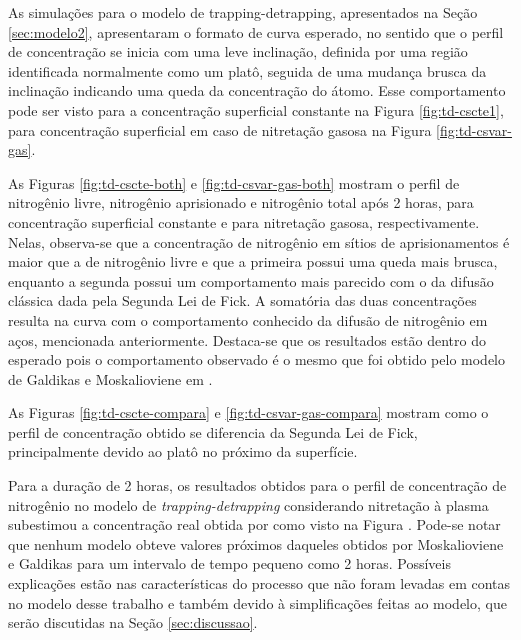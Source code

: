 
As simulações para o modelo de trapping-detrapping, apresentados na Seção \ref{sec:modelo2}, apresentaram o formato de curva esperado, no sentido que o perfil de concentração se inicia com uma leve inclinação, definida por uma região identificada normalmente como um platô, seguida de uma mudança brusca da inclinação indicando uma queda da concentração do átomo. Esse comportamento pode ser visto para a concentração superficial constante na Figura \ref{fig:td-cscte1}, para concentração superficial em caso de nitretação gasosa na Figura \ref{fig:td-csvar-gas}.

As Figuras \ref{fig:td-cscte-both} e \ref{fig:td-csvar-gas-both} mostram o perfil de nitrogênio livre, nitrogênio aprisionado e nitrogênio total após 2 horas, para concentração superficial constante e para nitretação gasosa, respectivamente. Nelas, observa-se que a concentração de nitrogênio em sítios de aprisionamentos é maior que a de nitrogênio livre e que a primeira possui uma queda mais brusca, enquanto a segunda possui um comportamento mais parecido com o da difusão clássica dada pela Segunda Lei de Fick. A somatória das duas concentrações resulta na curva com o comportamento conhecido da difusão de nitrogênio em aços, mencionada anteriormente. Destaca-se que os resultados estão dentro do esperado pois o comportamento observado é o mesmo que foi obtido pelo modelo de Galdikas e Moskalioviene em \cite{moskalioviene2011modeling}. 

As Figuras \ref{fig:td-cscte-compara} e \ref{fig:td-csvar-gas-compara} mostram como o perfil de concentração obtido se diferencia da Segunda Lei de Fick, principalmente devido ao platô no próximo da superfície.


Para a duração de 2 horas, os resultados obtidos para o perfil de concentração de nitrogênio no modelo de \textit{trapping-detrapping} considerando nitretação à plasma subestimou a concentração real obtida por \cite{moskalioviene2011modeling} como visto na Figura . Pode-se notar que nenhum modelo obteve valores próximos daqueles obtidos por Moskalioviene e Galdikas para um intervalo de tempo pequeno como 2 horas. Possíveis explicações estão nas características do processo que não foram levadas em contas no modelo desse trabalho e também devido à simplificações feitas ao modelo, que serão discutidas na Seção \ref{sec:discussao}.

